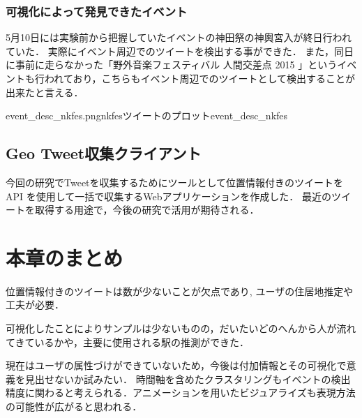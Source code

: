 \subsubsection{可視化によって発見できたイベント}
5月10日には実験前から把握していたイベントの神田祭の神輿宮入が終日行われていた\cite{webpage_kanda}．
実際にイベント周辺でのツイートを検出する事ができた．
また，同日に事前に走らなかった「野外音楽フェスティバル 人間交差点 2015 \cite{webpage_nkfes}」というイベントも行われており，こちらもイベント周辺でのツイートとして検出することが出来たと言える．

{event_desc_nkfes.png}{nkfesツイートのプロット}{event_desc_nkfes}

\subsection{Geo Tweet収集クライアント}
今回の研究でTweetを収集するためにツールとして位置情報付きのツイートを API を使用して一括で収集するWebアプリケーションを作成した．
最近のツイートを取得する用途で，今後の研究で活用が期待される．


\newpage

\section{本章のまとめ}
位置情報付きのツイートは数が少ないことが欠点であり, ユーザの住居地推定や工夫が必要．

可視化したことによりサンプルは少ないものの，だいたいどのへんから人が流れてきているかや，主要に使用される駅の推測ができた．


現在はユーザの属性づけができていないため，今後は付加情報とその可視化で意義を見出せないか試みたい．
時間軸を含めたクラスタリングもイベントの検出精度に関わると考えられる．アニメーションを用いたビジュアライズも表現方法の可能性が広がると思われる．

\newpage
